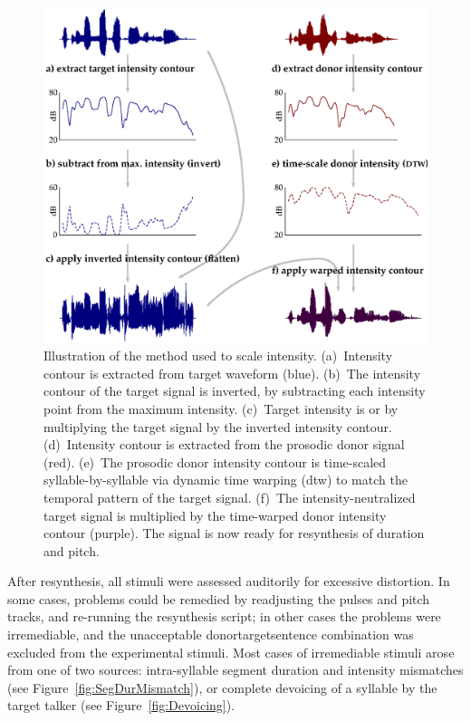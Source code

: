 \begin{figure}
	\begin{centering}
	\includegraphics{figures/intensity/intensity2.eps}
	\caption[Intensity scaling in resynthesis]{Illustration of the method used to scale intensity.  (a)~Intensity contour is extracted from target waveform (blue).  (b)~The intensity contour of the target signal is inverted, by subtracting each intensity point from the maximum intensity.  (c)~Target intensity is  or  by multiplying the target signal by the inverted intensity contour.  (d)~Intensity contour is extracted from the prosodic donor signal (red).  (e)~The prosodic donor intensity contour is time-scaled syllable-by-syllable via dynamic time warping (\ac{dtw}) to match the temporal pattern of the target signal.  (f)~The intensity-neutralized target signal is multiplied by the time-warped donor intensity contour (purple).  The signal is now ready for \psola{} resynthesis of duration and pitch.\label{fig:IntenManip}}
	\end{centering}
\end{figure}

After resynthesis, all stimuli were assessed auditorily for excessive distortion.  In some cases, problems could be remedied by readjusting the pulses and pitch tracks, and re-running the resynthesis script; in other cases the problems were irremediable, and the unacceptable donor\slsh{}target\slsh{}sentence combination was excluded from the experimental stimuli.  Most cases of irremediable stimuli arose from one of two sources: intra-syllable segment duration and intensity mismatches (see Figure~\ref{fig:SegDurMismatch}), or complete devoicing of a syllable by the target talker (see Figure~\ref{fig:Devoicing}).


